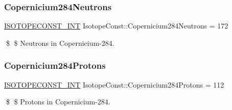 \subsubsection{\texorpdfstring{Copernicium284\+Neutrons}{Copernicium284Neutrons}}
{\footnotesize\ttfamily \mbox{\hyperlink{group___isotope_const-_macros_ga5f18360b3e99483a35c32d789e62621c}{I\+S\+O\+T\+O\+P\+E\+C\+O\+N\+S\+T\+\_\+\+I\+NT}} Isotope\+Const\+::\+Copernicium284\+Neutrons = 172}

\$ \$ Neutrons in Copernicium-\/284. \mbox{\label{group___isotope_const-_copernicium-_cn284_gafc567194012e6346f36cfb2ab99b67db}} 
\subsubsection{\texorpdfstring{Copernicium284\+Protons}{Copernicium284Protons}}
{\footnotesize\ttfamily \mbox{\hyperlink{group___isotope_const-_macros_ga5f18360b3e99483a35c32d789e62621c}{I\+S\+O\+T\+O\+P\+E\+C\+O\+N\+S\+T\+\_\+\+I\+NT}} Isotope\+Const\+::\+Copernicium284\+Protons = 112}

\$ \$ Protons in Copernicium-\/284. 